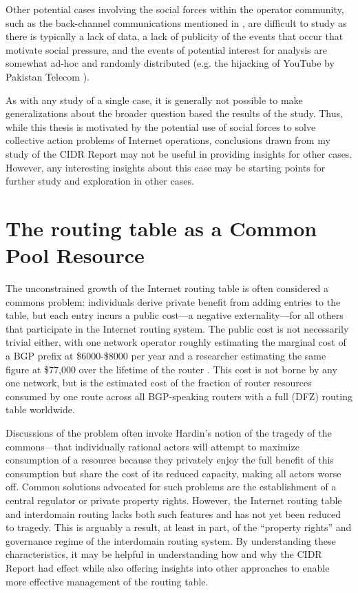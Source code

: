 Other potential cases involving the social forces within the operator
community, such as the back-channel communications mentioned in
\cite{Mathew:2010ly}, are difficult to study as there is typically a lack of
data, a lack of publicity of the events that occur that motivate social
pressure, and the events of potential interest for analysis are somewhat ad-hoc
and randomly distributed (e.g. the hijacking of YouTube by Pakistan Telecom
\cite{Brown:2008hc}).


As with any study of a single case, it is generally not possible to make
generalizations about the broader question based the results of the study.
Thus, while this thesis is motivated by the potential use of social forces to
solve collective action problems of Internet operations, conclusions drawn from
my study of the CIDR Report may not be useful in providing insights for other
cases. However, any interesting insights about this case may be starting points
for further study and exploration in other cases.

\section{The routing table as a Common Pool Resource}

The unconstrained growth of the Internet routing table is often considered a
commons problem: individuals derive private benefit from adding entries to the
table, but each entry incurs a public cost---a negative externality---for all
others that participate in the Internet routing system. The public cost is not
necessarily trivial either, with one network operator roughly estimating the
marginal cost of a BGP prefix at \$6000-\$8000 per year \cite{Herrin:2008qa}
and a researcher estimating the same figure at \$77,000 over the lifetime of
the router \cite{Clayton:2010bh}. This cost is not borne by any one network,
but is the estimated cost of the fraction of router resources consumed by one
route across all BGP-speaking routers with a full (DFZ) routing table
worldwide.

Discussions of the problem \cite{Huston:2001bs,Clayton:2010bh,Bellovin:2001qf}
often invoke Hardin's \cite{Hardin:1968uq} notion of the tragedy of the
commons---that individually rational actors will attempt to maximize
consumption of a resource because they privately enjoy the full benefit of this
consumption but share the cost of its reduced capacity, making all actors worse
off. Common solutions advocated for such problems are the establishment of a
central regulator or private property rights. However, the Internet routing
table and interdomain routing lacks both such features and has not yet been
reduced to tragedy. This is arguably a result, at least in part, of the
``property rights'' and governance regime of the interdomain routing system. By
understanding these characteristics, it may be helpful in understanding how and
why the CIDR Report had effect while also offering insights into other
approaches to enable more effective management of the routing table.

